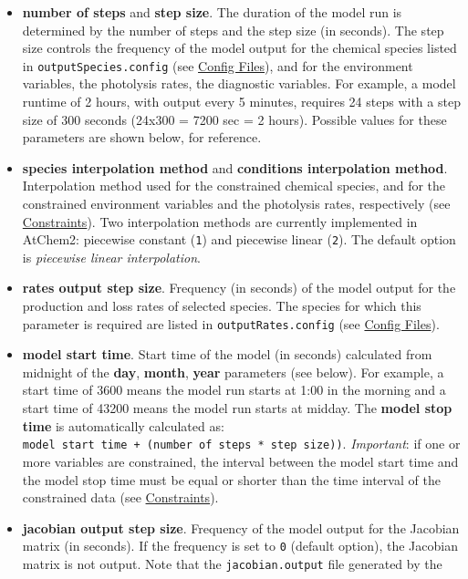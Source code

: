 \begin{itemize}
\item \textbf{number of steps} and \textbf{step size}. The duration of
  the model run is determined by the number of steps and the step size
  (in seconds). The step size controls the frequency of the model
  output for the chemical species listed in
  \texttt{outputSpecies.config} (see \hyperref[sec:config-files]{Config
    Files}), and for the environment variables, the photolysis rates,
  the diagnostic variables. For example, a model runtime of 2 hours,
  with output every 5 minutes, requires 24 steps with a step size of
  300 seconds (24x300 = 7200 sec = 2 hours). Possible values for these
  parameters are shown below, for reference.
\item \textbf{species interpolation method} and \textbf{conditions
    interpolation method}. Interpolation method used for the
  constrained chemical species, and for the constrained environment
  variables and the photolysis rates, respectively (see
  \hyperref[sec:constraints]{Constraints}). Two interpolation methods
  are currently implemented in AtChem2: piecewise constant
  (\texttt{1}) and piecewise linear (\texttt{2}). The default option
  is \emph{piecewise linear interpolation}.
\item \textbf{rates output step size}. Frequency (in seconds) of the
  model output for the production and loss rates of selected
  species. The species for which this parameter is required are listed
  in \texttt{outputRates.config} (see \hyperref[sec:config-files]{Config
    Files}).
\item \textbf{model start time}. Start time of the model (in seconds)
  calculated from midnight of the \textbf{day}, \textbf{month},
  \textbf{year} parameters (see below). For example, a start time of
  3600 means the model run starts at 1:00 in the morning and a start
  time of 43200 means the model run starts at midday. The
  \textbf{model stop time} is automatically calculated as:
  \texttt{model\ start\ time\ +\ (number\ of\ steps\ *\ step\
    size))}. \emph{Important}: if one or more variables are
  constrained, the interval between the model start time and the model
  stop time must be equal or shorter than the time interval of the
  constrained data (see \hyperref[sec:constraints]{Constraints}).
\item \textbf{jacobian output step size}. Frequency of the model
  output for the Jacobian matrix (in seconds). If the frequency is set
  to \texttt{0} (default option), the Jacobian matrix is not
  output. Note that the \texttt{jacobian.output} file generated by the

\end{itemize}
